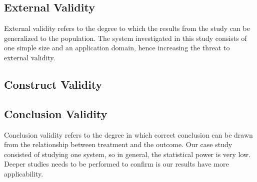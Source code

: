 
\subsection{External Validity}
\label{sub:external_validity}
External validity refers to the degree to which the results from the study can be generalized to the population. The system investigated in this study consists of one simple size and an application domain, hence increasing the threat to external validity. 

\subsection{Construct Validity} %
\label{sub:construct_validity}

\subsection{Conclusion Validity} %
\label{sub:conclusion_validity}
Conclusion validity refers to the degree in which correct conclusion can be drawn from the relationship between treatment and the outcome. Our case study consisted of studying one system, so in general, the statistical power is very low. Deeper studies needs to be performed to confirm is our results have more applicability.













